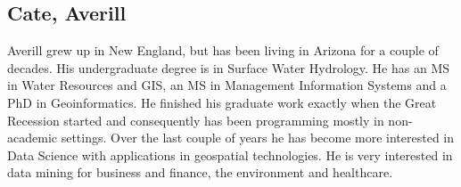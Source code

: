 
\subsection{Cate, Averill}

Averill grew up in New England, but has been living in Arizona for a couple of decades.  His undergraduate degree is in Surface Water Hydrology.  He has an MS in Water Resources and GIS, an MS in Management Information Systems and a PhD in Geoinformatics.  He finished his graduate work exactly when the Great Recession started and consequently has been programming mostly in non-academic settings.  Over the last couple of years he has become more interested in Data Science with applications in geospatial technologies.  He is very interested in data mining for business and finance, the environment and healthcare.

